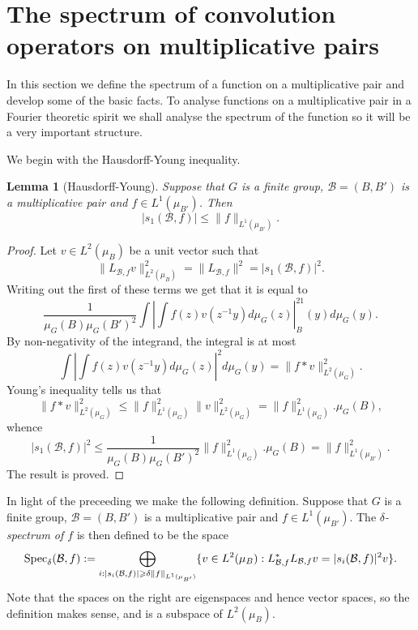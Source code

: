 \documentclass[12pt]{amsart}
\numberwithin{equation}{section}
\theoremstyle{plain}
\newtheorem{lemma}[subsection]{Lemma}
\theoremstyle{definition}
\renewcommand{\leq}{\leqslant}
\renewcommand{\geq}{\geqslant}
\providecommand{\Spec}{\mathop{\rm Spec}\nolimits}
\begin{document}
\section{The spectrum of convolution operators on multiplicative pairs}\label{sec.locspec}

In this section we define the spectrum of a function on a multiplicative pair and develop some of the basic facts.  To analyse functions on a multiplicative pair in a Fourier theoretic spirit we shall analyse the spectrum of the function so it will be a very important structure.

We begin with the Hausdorff-Young inequality.
\begin{lemma}[Hausdorff-Young]\label{lem.hdy}
Suppose that $G$ is a finite group, $\mathcal{B}=(B,B')$ is a multiplicative pair and $f \in L^1(\mu_{B'})$.  Then
\begin{equation*}
|s_1(\mathcal{B},f)| \leq \|f\|_{L^1(\mu_{B'})}.
\end{equation*}
\end{lemma}
\begin{proof}
Let $v \in L^2(\mu_B)$ be a unit vector such that
\begin{equation*}
\|L_{\mathcal{B},f}v\|_{L^2(\mu_B)}^2=\|L_{\mathcal{B},f}\|^2=|s_1(\mathcal{B},f)|^2.
\end{equation*}
Writing out the first of these terms we get that it is equal to
\begin{equation*}
\frac{1}{\mu_G(B)\mu_G(B')^2}\int{\left|\int{f(z)v(z^{-1}y)d\mu_G(z)}\right|^21_B(y)d\mu_G(y)}.
\end{equation*}
By non-negativity of the integrand, the integral is at most
\begin{equation*}
\int{\left|\int{f(z)v(z^{-1}y)d\mu_G(z)}\right|^2d\mu_G(y)}=  \|f \ast v\|_{L^2(\mu_G)}^2.
\end{equation*}
Young's inequality tells us that
\begin{equation*}
\|f \ast v\|_{L^2(\mu_G)}^2 \leq \|f\|_{L^1(\mu_G)}^2\|v\|_{L^2(\mu_G)}^2 =  \|f\|_{L^1(\mu_G)}^2.\mu_G(B),
\end{equation*}
whence
\begin{equation*}
|s_1(\mathcal{B},f)| ^2 \leq \frac{1}{\mu_G(B)\mu_G(B')^2}\|f\|_{L^1(\mu_G)}^2.\mu_G(B) = \|f\|_{L^1(\mu_{B'})}^2.
\end{equation*}
The result is proved.
\end{proof}
In light of the preceeding we make the following definition.  Suppose that $G$ is a finite group, $\mathcal{B}=(B,B')$ is a multiplicative pair and $f \in L^1(\mu_{B'})$. The \emph{$\delta$-spectrum of $f$} is then defined to be the space
\begin{equation*}
\Spec_\delta(\mathcal{B},f):=\bigoplus_{i: |s_i(\mathcal{B},f)| \geq \delta \|f\|_{L^1(\mu_{B'})}}\{v \in L^2(\mu_B) : L_{\mathcal{B},f}^*L_{\mathcal{B},f}v=|s_i(\mathcal{B},f)|^2v\}.
\end{equation*}
Note that the spaces on the right are eigenspaces and hence vector spaces, so the definition makes sense, and is a subspace of $L^2(\mu_B)$.
\end{document}
